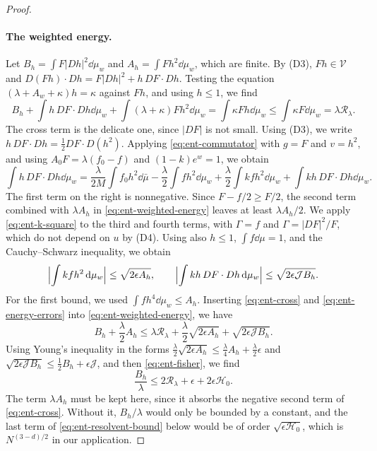 \begin{proof}
\paragraph{The weighted energy.}
Let $B_h=\int F|Dh|^2\dd\mu_w$ and $A_h=\int Fh^2\dd\mu_w$, which are finite.
By (D3), $Fh\in\mathcal V$ and $D(Fh)\cdot Dh=F|Dh|^2+h\,DF\cdot Dh$.
Testing the equation $(\lambda+A_w+\kappa)h=\kappa$ against $Fh$, and using
$h\le1$, we find
\begin{equation}\label{eq:ent-weighted-energy}
 B_h+\int h\,DF\cdot Dh\dd\mu_w+\int(\lambda+\kappa)Fh^2\dd\mu_w
 =\int\kappa Fh\dd\mu_w\le\int\kappa F\dd\mu_w=\lambda\mathcal R_\lambda .
\end{equation}
The cross term is the delicate one, since $|DF|$ is not small. Using (D3), we write
$h\,DF\cdot Dh=\frac12DF\cdot D(h^2)$. Applying \eqref{eq:ent-commutator}
with $g=F$ and $v=h^2$, and using $A_0F=\lambda(f_0-f)$ and
$(1-k)e^w=1$, we obtain
\begin{equation}\label{eq:ent-cross}
 \int h\,DF\cdot Dh\dd\mu_w
 =\frac{\lambda}{2M}\int f_0h^2\dd\bar\mu
 -\frac\lambda2\int fh^2\dd\mu_w+\frac\lambda2\int kfh^2\dd\mu_w
 +\int kh\,DF\cdot Dh\dd\mu_w .
\end{equation}
The first term on the right is nonnegative. Since $F-f/2\ge F/2$, the second
term combined with $\lambda A_h$ in \eqref{eq:ent-weighted-energy} leaves at
least $\lambda A_h/2$. We apply \eqref{eq:ent-k-square} to the third and fourth
terms, with $\Gamma=f$ and $\Gamma=|DF|^2/F$, which do not depend on $u$ by
(D4). Using also $h\le1$, $\int f\dd\mu=1$, and the Cauchy--Schwarz
inequality, we obtain
\begin{equation}\label{eq:ent-energy-errors}
 \Bigl|\int kfh^2\,\mathrm d\mu_w\Bigr|\le\sqrt{2\epsilon A_h},\qquad
 \Bigl|\int kh\,DF\cdot Dh\,\mathrm d\mu_w\Bigr|\le\sqrt{2\epsilon\mathcal JB_h}.
\end{equation}
For the first bound, we used $\int fh^4\dd\mu_w\le A_h$. Inserting
\eqref{eq:ent-cross} and \eqref{eq:ent-energy-errors} into
\eqref{eq:ent-weighted-energy}, we have
\[
 B_h+\frac\lambda2A_h\le\lambda\mathcal R_\lambda
 +\frac\lambda2\sqrt{2\epsilon A_h}+\sqrt{2\epsilon\mathcal JB_h}.
\]
Using Young's inequality in the forms $\frac\lambda2\sqrt{2\epsilon A_h}
\le\frac\lambda4A_h+\frac\lambda2\epsilon$ and
$\sqrt{2\epsilon\mathcal JB_h}\le\frac12B_h+\epsilon\mathcal J$, and then
\eqref{eq:ent-fisher}, we find
\begin{equation}\label{eq:ent-energy}
 \frac{B_h}{\lambda}\le2\mathcal R_\lambda+\epsilon+2\epsilon\mathcal H_0 .
\end{equation}
The term $\lambda A_h$ must be kept here, since it absorbs the negative
second term of \eqref{eq:ent-cross}. Without it, $B_h/\lambda$ would only be
bounded by a constant, and the last term of \eqref{eq:ent-resolvent-bound}
below would be of order $\sqrt{\epsilon\mathcal H_0}$, which is
$N^{(3-d)/2}$ in our application.


\end{proof}
